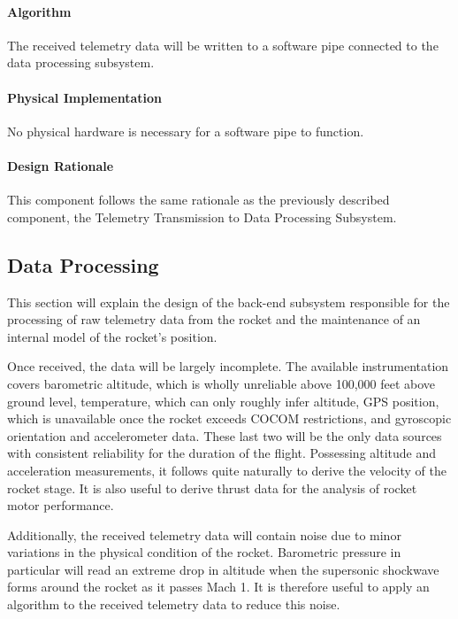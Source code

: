 \documentclass[journal,10pt,onecolumn,compsoc]{IEEEtran}
\begin{document}
			\paragraph{Algorithm}
				\noindent The received telemetry data will be written to a software pipe connected to the data processing subsystem.

			\paragraph{Physical Implementation}
				\noindent No physical hardware is necessary for a software pipe to function.

			\paragraph{Design Rationale}
				\noindent This component follows the same rationale as the previously described component, the Telemetry Transmission to Data Processing Subsystem.

	\subsection{Data Processing}
		\noindent This section will explain the design of the back-end subsystem responsible for the processing of raw telemetry data from the rocket and the maintenance of an internal model of the rocket's position.

		\noindent Once received, the data will be largely incomplete.
		The available instrumentation covers barometric altitude, which is wholly unreliable above 100,000 feet above ground level, temperature, which can only roughly infer altitude, GPS position, which is unavailable once the rocket exceeds COCOM restrictions, and gyroscopic orientation and accelerometer data.
		These last two will be the only data sources with consistent reliability for the duration of the flight.
		Possessing altitude and acceleration measurements, it follows quite naturally to derive the velocity of the rocket stage.
		It is also useful to derive thrust data for the analysis of rocket motor performance.

		\noindent Additionally, the received telemetry data will contain noise due to minor variations in the physical condition of the rocket.
		Barometric pressure in particular will read an extreme drop in altitude when the supersonic shockwave forms around the rocket as it passes Mach 1.
		It is therefore useful to apply an algorithm to the received telemetry data to reduce this noise.
\end{document}
